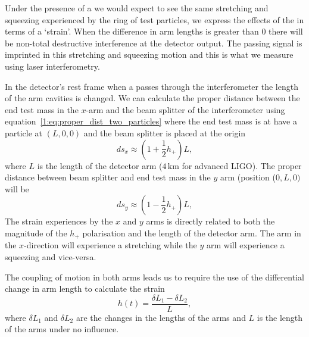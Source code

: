 Under the presence of a \gw we would expect to see the same stretching and squeezing experienced by the ring of test particles, we express the effects of the \gw in terms of a `strain'. When the difference in arm lengths is greater than 0 there will be non-total destructive interference at the detector output. The passing \gwadj signal is imprinted in this stretching and squeezing motion and this is what we measure using laser interferometry.

In the detector's rest frame when a \gw passes through the interferometer the length of the arm cavities is changed. We can calculate the proper distance between the end test mass in the $x$-arm and the beam splitter of the interferometer using equation~\ref{1:eq:proper_dist_two_particles} where the end test mass is at have a particle at $(L, 0, 0)$ and the beam splitter is placed at the origin
%
\begin{equation}
    ds_{x} \approx \left(1 + \frac{1}{2}h_+\right)L,
\end{equation}
%
where $L$ is the length of the detector arm ($4 \, \text{km}$ for advanced LIGO). The proper distance between beam splitter and end test mass in the $y$ arm (position ($0, L, 0)$ will be
%
\begin{equation}
    ds_{y} \approx \left(1 - \frac{1}{2}h_+\right)L,
\end{equation}
%
The strain experiences by the $x$ and $y$ arms is directly related to both the magnitude of the $h_{+}$ \gwadj polarisation and the length of the detector arm. The arm in the $x$-direction will experience a stretching while the $y$ arm will experience a squeezing and vice-versa. 

The coupling of motion in both arms leads us to require the use of the differential change in arm length to calculate the \gwadj strain
%
\begin{equation}
    h(t) = \frac{\delta L_1 - \delta L_2}{L},
\end{equation}
%
where $\delta L_{1}$ and $\delta L_{2}$ are the changes in the lengths of the arms and $L$ is the length of the arms under no \gw influence.

